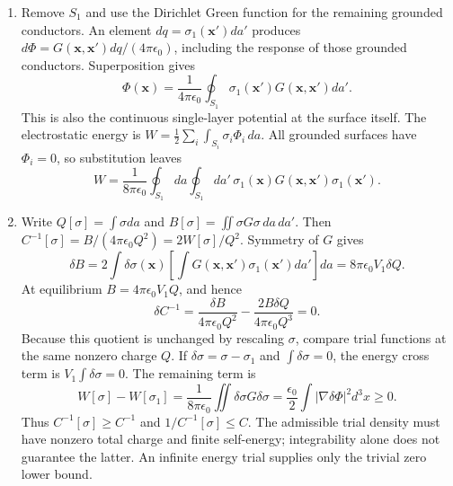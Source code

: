 \begin{enumerate}
\item[(a)] Remove $S_1$ and use the Dirichlet Green function for the remaining
grounded conductors. An element $dq=\sigma_1(\mathbf x')da'$ produces
$d\Phi=G(\mathbf x,\mathbf x')dq/(4\pi\epsilon_0)$, including the response
of those grounded conductors. Superposition gives
\[
\boxed{\Phi(\mathbf x)=\frac1{4\pi\epsilon_0}
\oint_{S_1}\sigma_1(\mathbf x')G(\mathbf x,\mathbf x')da'.}
\]
This is also the continuous single-layer potential at the surface itself.
The electrostatic energy is $W=\tfrac12\sum_i\int_{S_i}\sigma_i\Phi_i\,da$.
All grounded surfaces have $\Phi_i=0$, so substitution leaves
\[
\boxed{W=\frac1{8\pi\epsilon_0}\oint_{S_1}\!da\oint_{S_1}\!da'\,
\sigma_1(\mathbf x)G(\mathbf x,\mathbf x')\sigma_1(\mathbf x').}
\]
\item[(b)] Write $Q[\sigma]=\int\sigma da$ and
$B[\sigma]=\iint\sigma G\sigma\,da\,da'$. Then
$C^{-1}[\sigma]=B/(4\pi\epsilon_0Q^2)=2W[\sigma]/Q^2$.
Symmetry of $G$ gives
\[
\delta B=2\int\delta\sigma(\mathbf x)
\left[\int G(\mathbf x,\mathbf x')\sigma_1(\mathbf x')da'\right]da
=8\pi\epsilon_0V_1\delta Q.
\]
At equilibrium $B=4\pi\epsilon_0V_1Q$, and hence
\[
\delta C^{-1}=\frac{\delta B}{4\pi\epsilon_0Q^2}
-\frac{2B\delta Q}{4\pi\epsilon_0Q^3}=0.
\]
Because this quotient is unchanged by rescaling $\sigma$, compare trial
functions at the same nonzero charge $Q$. If $\delta\sigma=\sigma-\sigma_1$
and $\int\delta\sigma=0$, the energy cross term is
$V_1\int\delta\sigma=0$. The remaining term is
\[
W[\sigma]-W[\sigma_1]=\frac1{8\pi\epsilon_0}\iint\delta\sigma G\delta\sigma
=\frac{\epsilon_0}{2}\int|\nabla\delta\Phi|^2d^3x\ge0.
\]
Thus $C^{-1}[\sigma]\ge C^{-1}$ and
$\boxed{1/C^{-1}[\sigma]\le C}$.
The admissible trial density must have nonzero total charge and finite
self-energy; integrability alone does not guarantee the latter. An infinite
energy trial supplies only the trivial zero lower bound.
\end{enumerate}



